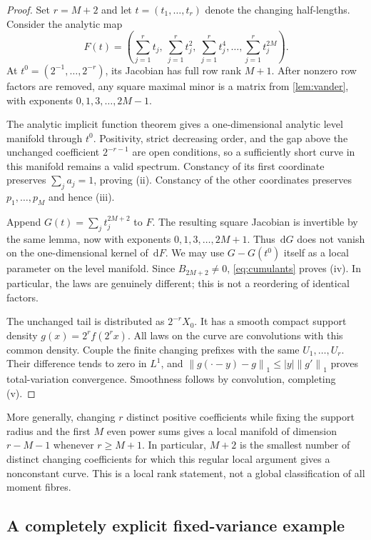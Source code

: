 \documentclass[11pt,a4paper]{article}
\theoremstyle{definition}
\theoremstyle{remark}
\newcommand{\dd}{\,\mathrm d}
\newcommand{\norm}[1]{\left\lVert #1\right\rVert}
\begin{document}
\begin{proof}
Set $r=M+2$ and let $t=(t_1,\ldots,t_r)$ denote the changing half-lengths.
Consider the analytic map
\[
 F(t)=\left(\sum_{j=1}^r t_j,\ \sum_{j=1}^r t_j^2,
                 \ \sum_{j=1}^r t_j^4,\ldots,
                    \sum_{j=1}^r t_j^{2M}\right).
\]
At $t^0=(2^{-1},\ldots,2^{-r})$, its Jacobian has full row rank $M+1$.
After nonzero row factors are removed, any square maximal minor is a
matrix from \cref{lem:vander}, with exponents
$0,1,3,\ldots,2M-1$.

The analytic implicit function theorem gives a one-dimensional analytic
level manifold through $t^0$. Positivity, strict decreasing order, and the
gap above the unchanged coefficient $2^{-r-1}$ are open conditions, so a
sufficiently short curve in this manifold remains a valid spectrum.
Constancy of its first coordinate preserves $\sum_j a_j=1$, proving (ii).
Constancy of the other coordinates preserves $p_1,\ldots,p_M$ and hence
(iii).

Append $G(t)=\sum_j t_j^{2M+2}$ to $F$. The resulting square Jacobian is
invertible by the same lemma, now with exponents
$0,1,3,\ldots,2M+1$. Thus $\dd G$ does not vanish on the one-dimensional
kernel of $\dd F$. We may use $G-G(t^0)$ itself as a local parameter on
the level manifold. Since $B_{2M+2}\ne0$, \eqref{eq:cumulants} proves (iv).
In particular, the laws are genuinely different; this is not a
reordering of identical factors.

The unchanged tail is distributed as $2^{-r}X_0$. It has a smooth compact
support density $g(x)=2^r f(2^rx)$. All laws on the curve are convolutions
with this common density. Couple the finite changing prefixes with the
same $U_1,\ldots,U_r$. Their difference tends to zero in $L^1$, and
$\norm{g(\cdot-y)-g}_1\le |y|\norm{g'}_1$ proves total-variation
convergence. Smoothness follows by convolution, completing (v).
\end{proof}

More generally, changing $r$ distinct positive coefficients while fixing
the support radius and the first $M$ even power sums gives a local
manifold of dimension $r-M-1$ whenever $r\ge M+1$. In particular, $M+2$
is the smallest number of distinct changing coefficients for which this
regular local argument gives a nonconstant curve. This is a local rank
statement, not a global classification of all moment fibres.

\subsection{A completely explicit fixed-variance example}
\end{document}
